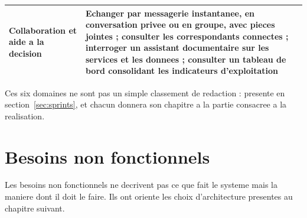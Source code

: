 \begin{table}[H]
\begin{tabularx}{\textwidth}{@{}p{3.1cm}X@{}}
Collaboration et aide a la decision &
  Echanger par messagerie instantanee, en conversation privee ou en
  groupe, avec pieces jointes ; consulter les correspondants connectes ;
  interroger un assistant documentaire sur les services et les donnees ;
  consulter un tableau de bord consolidant les indicateurs
  d'exploitation \\

\bottomrule
\end{tabularx}
\end{table}

Ces six domaines ne sont pas un simple classement de redaction :
 presente en
section~\ref{sec:sprints}, et chacun donnera son chapitre a la partie
consacree a la realisation.

\section{Besoins non fonctionnels}
\label{sec:besoins-non-fonctionnels}

Les besoins non fonctionnels ne decrivent pas ce que fait le systeme mais
la maniere dont il doit le faire. Ils ont oriente les choix
d'architecture presentes au chapitre suivant.

